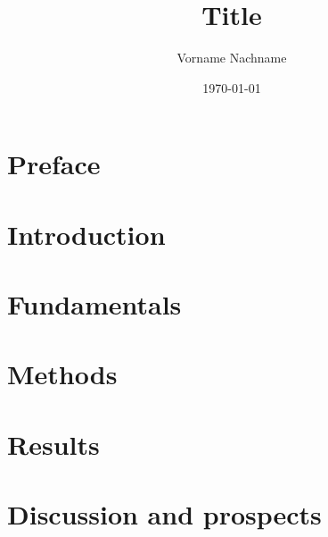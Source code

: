 \documentclass[a4paper, abstract=on]{scrreprt}
\title{Title}
\author{Vorname Nachname}
\date{\today}
\begin{document}


\clearpage
\setcounter{page}{1}



\begin{abstract}

\end{abstract}

\chapter*{Preface}

\thispagestyle{empty}

\tableofcontents
\thispagestyle{empty}


\chapter{Introduction}
\setcounter{page}{1}


\chapter{Fundamentals}


\chapter{Methods}


\chapter{Results}


\chapter{Discussion and prospects}


\newpage

\listoffigures

\printbibliography[title=Bibliography]
\end{document}
